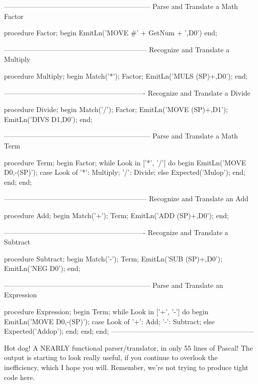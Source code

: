 \documentclass[float=false, crop=false]{standalone}
\begin{document}
\begin{code}
{---------------------------------------------------------------}
{ Parse and Translate a Math Factor }

procedure Factor;
begin
   EmitLn('MOVE #' + GetNum + ',D0')
end;


{--------------------------------------------------------------}
{ Recognize and Translate a Multiply }

procedure Multiply;
begin
   Match('*');
   Factor;
   EmitLn('MULS (SP)+,D0');
end;


{-------------------------------------------------------------}
{ Recognize and Translate a Divide }

procedure Divide;
begin
   Match('/');
   Factor;
   EmitLn('MOVE (SP)+,D1');
   EmitLn('DIVS D1,D0');
end;


{---------------------------------------------------------------}
{ Parse and Translate a Math Term }

procedure Term;
begin
   Factor;
   while Look in ['*', '/'] do begin
      EmitLn('MOVE D0,-(SP)');
      case Look of
       '*': Multiply;
       '/': Divide;
      else Expected('Mulop');
      end;
   end;
end;


{--------------------------------------------------------------}
{ Recognize and Translate an Add }

procedure Add;
begin
   Match('+');
   Term;
   EmitLn('ADD (SP)+,D0');
end;


{-------------------------------------------------------------}
{ Recognize and Translate a Subtract }

procedure Subtract;
begin
   Match('-');
   Term;
   EmitLn('SUB (SP)+,D0');
   EmitLn('NEG D0');
end;


{---------------------------------------------------------------}
{ Parse and Translate an Expression }

procedure Expression;
begin
   Term;
   while Look in ['+', '-'] do begin
      EmitLn('MOVE D0,-(SP)');
      case Look of
       '+': Add;
       '-': Subtract;
      else Expected('Addop');
      end;
   end;
end;
{--------------------------------------------------------------}
\end{code}

Hot dog! A NEARLY functional parser/translator, in only 55 lines of Pascal! The
output is starting to look really useful, if you continue to overlook the
inefficiency, which I hope you will. Remember, we're not trying to produce tight
code here.
\end{document}
